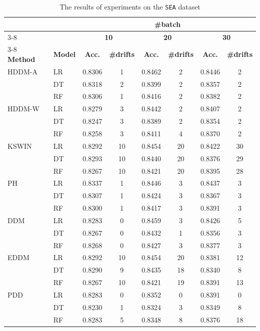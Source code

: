 \documentclass[pdflatex,sn-mathphys-ay]{sn-jnl}%
\theoremstyle{thmstyleone}%
\theoremstyle{thmstyletwo}%
\theoremstyle{thmstylethree}%
\begin{document}
\begin{table}[h]
    \centering
    \scriptsize
    \caption{The results of experiments on the \texttt{SEA} dataset}
    \label{tab:exp_SEA}
    \begin{tabular}{llcccccc}\toprule
        && \multicolumn{6}{c}{\textbf{\#batch}}\\\cmidrule(lr){3-8}
        && \multicolumn{2}{c}{\textbf{10}}    & \multicolumn{2}{c}{\textbf{20}}    & \multicolumn{2}{c}{\textbf{30}} \\\cmidrule(lr){3-8}
        \textbf{Method} & \textbf{Model} & \textbf{Acc.} & \textbf{\#drifts} & \textbf{Acc.} & \textbf{\#drifts} & \textbf{Acc.} & \textbf{\#drifts} \\\midrule
        HDDM-A & LR   & 0.8306 & 1  & 0.8462 & 2  & 0.8446 & 2 \\
               & DT   & 0.8318 & 2  & 0.8399 & 2  & 0.8357 & 2 \\
               & RF   & 0.8306 & 1  & 0.8416 & 2  & 0.8382 & 2 \\\midrule
        HDDM-W & LR   & 0.8279 & 3  & 0.8442 & 2  & 0.8407 & 2 \\
               & DT   & 0.8247 & 3  & 0.8389 & 2  & 0.8354 & 2 \\
               & RF   & 0.8258 & 3  & 0.8411 & 4  & 0.8370 & 2 \\\midrule
        KSWIN  & LR   & 0.8292 & 10 & 0.8454 & 20 & 0.8422 & 30 \\
               & DT   & 0.8293 & 10 & 0.8440 & 20 & 0.8376 & 29 \\
               & RF   & 0.8267 & 10 & 0.8421 & 20 & 0.8395 & 28 \\\midrule
        PH     & LR   & 0.8337 & 1  & 0.8446 & 3  & 0.8437 & 3 \\
               & DT   & 0.8307 & 1  & 0.8424 & 3  & 0.8367 & 3 \\
               & RF   & 0.8300 & 1  & 0.8417 & 3  & 0.8391 & 3 \\\midrule
        DDM    & LR   & 0.8283 & 0  & 0.8459 & 3  & 0.8426 & 5 \\
               & DT   & 0.8267 & 0  & 0.8432 & 1  & 0.8356 & 3 \\
               & RF   & 0.8268 & 0  & 0.8427 & 3  & 0.8377 & 3 \\\midrule
        EDDM   & LR   & 0.8292 & 10 & 0.8454 & 20 & 0.8381 & 12 \\
               & DT   & 0.8290 & 9  & 0.8435 & 18 & 0.8340 & 8 \\
               & RF   & 0.8267 & 10 & 0.8421 & 19 & 0.8391 & 13 \\\midrule
        PDD    & LR   & 0.8283 & 0  & 0.8352 & 0  & 0.8391 & 0 \\
               & DT   & 0.8230 & 1  & 0.8324 & 3  & 0.8349 & 8 \\
               & RF   & 0.8283 & 5  & 0.8348 & 8  & 0.8376 & 18 \\\bottomrule
    \end{tabular}
\end{table}
\end{document}
